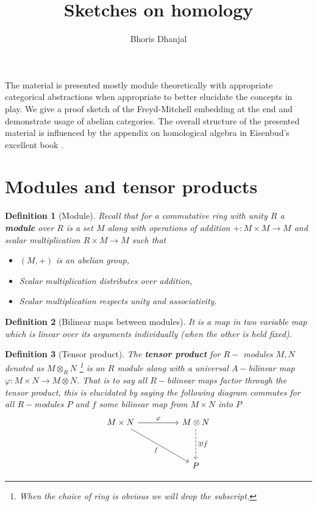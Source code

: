 \documentclass[12pt]{article}
\title{Sketches on homology}
\author{Bhoris Dhanjal}
\numberwithin{equation}{section}
\newtheorem{definition}{Definition}[section]
\begin{document}
	\tableofcontents
	\maketitle
	The material is presented mostly module theoretically with appropriate categorical abstractions when appropriate to better elucidate the concepts in play. We give a proof sketch of the Freyd-Mitchell embedding at the end and demonstrate usage of abelian categories. The overall structure of the presented material is influenced by the appendix on homological algebra in Eisenbud's excellent book \cite{eisenbud2013commutative}.

	\section{Modules and tensor products}
	\begin{definition}[Module]
			Recall that for a commutative ring with unity $R$ a \textbf{module} over $R$ is a set $M$ along with operations of addition $+:M\times M \to M$ and scalar multiplication $R\times M \to M$ such that 
		\begin{itemize}
			\item $(M,+)$ is an abelian group,
			\item Scalar multiplication distributes over addition,
			\item Scalar multiplication respects unity and associativity.
		\end{itemize}
	\end{definition}
	
	\begin{definition}[Bilinear maps between modules]
		It is a map in two variable map which is linear over its arguments individually (when the other is held fixed).
	\end{definition}
	
	\begin{definition}[Tensor product]
			The \textbf{tensor product} for $R-$ modules $M,N$ denoted as $M \otimes_R N$ \footnote{When the choice of ring is obvious we will drop the subscript.} is an $R$ module along with a universal $A-$bilinear map $\varphi:	M \times N \to M \otimes N$. That is to say all $R-$bilinear maps factor through the tensor product, this is elucidated by saying the following diagram commutes for all $ R-$modules $P$ and $f$ some bilinear map from $M \times N$ into $P$
		\[\begin{tikzcd}
			{M\times N} && {M\otimes N} \\
			\\
			&& P
			\arrow["\varphi", from=1-1, to=1-3]
			\arrow["f"', from=1-1, to=3-3]
			\arrow["{\exists! \tilde{f}}", dashed, from=1-3, to=3-3]
		\end{tikzcd}\]
	\end{definition}
	
\end{document}
